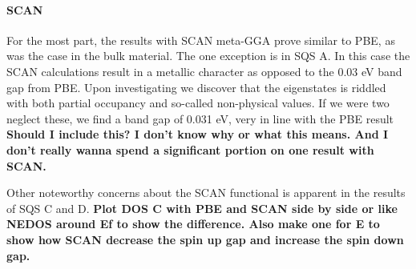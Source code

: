 \paragraph{SCAN \\}
For the most part, the results with SCAN meta-GGA prove similar to PBE, as was the case in the bulk material. The one exception is in SQS A. In this case the SCAN calculations result in a metallic character as opposed to the 0.03 eV band gap from PBE. Upon investigating we discover that the eigenstates is riddled with both partial occupancy and so-called non-physical values. If we were two neglect these, we find a band gap of 0.031 eV, very in line with the PBE result \textbf{Should I include this? I don't know why or what this means. And I don't really wanna spend a significant portion on one result with SCAN.} 

Other noteworthy concerns about the SCAN functional is apparent in the results of SQS C and D. 
\textbf{Plot DOS C with PBE and SCAN side by side or like NEDOS around Ef to show the difference. Also make one for E to show how SCAN decrease the spin up gap and increase the spin down gap.}

